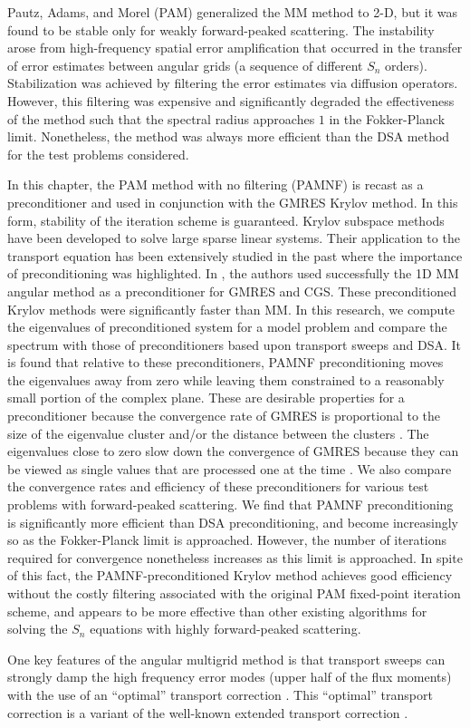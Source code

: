 Pautz, Adams, and Morel (PAM) \cite{multigrid_2d} generalized the MM method to
2-D, but it was found to be stable only for weakly forward-peaked scattering.
The instability arose from high-frequency spatial error amplification that
occurred in the transfer of error estimates between angular grids (a sequence
of different $S_n$ orders). Stabilization was achieved by filtering the error
estimates via diffusion operators. However, this filtering was expensive and
significantly degraded the effectiveness of the method such that the spectral
radius approaches $1$ in the Fokker-Planck limit.  Nonetheless, the method was 
always more efficient than the DSA method for the test problems considered.

In this chapter, the PAM method with no filtering (PAMNF) is recast as a 
preconditioner and used in conjunction with the GMRES Krylov method. In this form, 
stability of the iteration scheme is guaranteed. Krylov subspace methods have been 
developed to solve large sparse linear systems. Their application to the transport 
equation has been extensively studied in the past \cite{faber,oliveira,patton,warsa} 
where the importance of preconditioning was highlighted. In \cite{oliveira}, the 
authors used successfully the 1D MM angular method as a preconditioner for GMRES 
and CGS. These preconditioned Krylov methods were significantly faster than MM. 
In this research, we compute the eigenvalues of preconditioned system for a model 
problem and compare the spectrum with those of preconditioners based upon transport 
sweeps and DSA. It is found that relative to these preconditioners, PAMNF 
preconditioning moves the eigenvalues away from zero while leaving them 
constrained to a reasonably small portion of the complex plane. These are 
desirable properties for a preconditioner because the convergence rate of GMRES 
is proportional to the size of the eigenvalue cluster and/or the distance between 
the clusters \cite{campbell,warsa}. The eigenvalues close to zero slow down the 
convergence of GMRES because they can be viewed as single values that are processed 
one at the time \cite{campbell,warsa}. We also compare the convergence rates and 
efficiency of these preconditioners for various test problems with forward-peaked 
scattering. We find that PAMNF preconditioning is significantly more efficient 
than DSA preconditioning, and become increasingly so as the Fokker-Planck limit 
is approached. However, the number of iterations required for convergence 
nonetheless increases as this limit is approached. In spite of this fact, 
the PAMNF-preconditioned Krylov method achieves good efficiency without the 
costly filtering associated with the original PAM fixed-point iteration scheme, 
and appears to be more effective than other existing algorithms for solving 
the $S_n$ equations with highly forward-peaked scattering.

One key features of the angular multigrid method is that transport sweeps can
strongly damp the high frequency error modes (upper half of the flux moments)
with the use of an ``optimal'' transport correction \cite{multigrid_1d}. This
``optimal'' transport correction is a variant of the well-known extended
transport correction \cite{lathrop,morel_79}.

